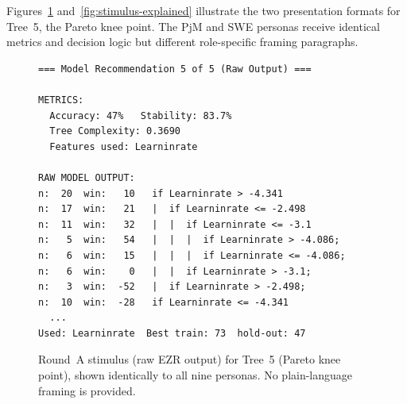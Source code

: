 \documentclass[sigconf,review]{acmart}
\begin{document}
Figures~\ref{fig:stimulus-raw} and~\ref{fig:stimulus-explained}
illustrate the two presentation formats for Tree~5, the Pareto knee
point. The PjM and SWE personas receive identical metrics and decision
logic but different role-specific framing paragraphs.

\begin{figure}[ht]
\begin{mdframed}[backgroundcolor=boxgray, linecolor=boxborder,
                 linewidth=0.8pt, innerleftmargin=6pt,
                 innerrightmargin=6pt, innertopmargin=5pt,
                 innerbottommargin=5pt]
\begin{lstlisting}
=== Model Recommendation 5 of 5 (Raw Output) ===

METRICS:
  Accuracy: 47%   Stability: 83.7%
  Tree Complexity: 0.3690
  Features used: Learninrate

RAW MODEL OUTPUT:
n:  20  win:   10   if Learninrate > -4.341
n:  17  win:   21   |  if Learninrate <= -2.498
n:  11  win:   32   |  |  if Learninrate <= -3.1
n:   5  win:   54   |  |  |  if Learninrate > -4.086;
n:   6  win:   15   |  |  |  if Learninrate <= -4.086;
n:   6  win:    0   |  |  if Learninrate > -3.1;
n:   3  win:  -52   |  if Learninrate > -2.498;
n:  10  win:  -28   if Learninrate <= -4.341
  ...
Used: Learninrate  Best train: 73  hold-out: 47
\end{lstlisting}
\end{mdframed}
\caption{Round~A stimulus (raw EZR output) for Tree~5 (Pareto knee
         point), shown identically to all nine personas. No
         plain-language framing is provided.}
\label{fig:stimulus-raw}
\end{figure}
\end{document}
